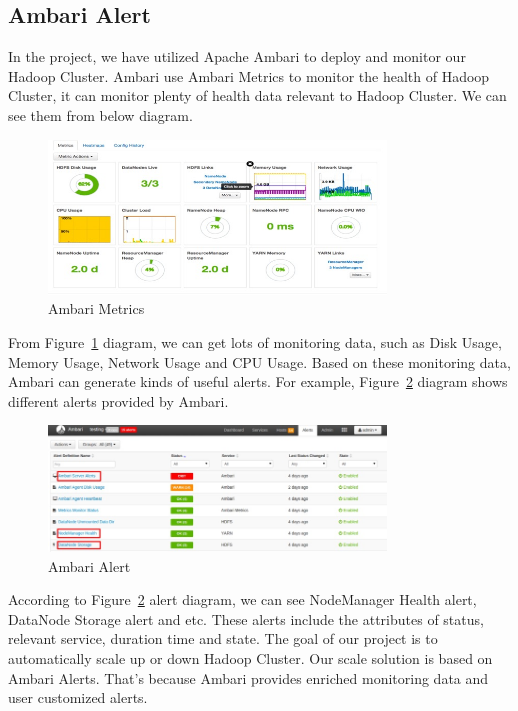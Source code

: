 \documentclass{article}
\begin{document}
\subsection{Ambari Alert}
In the project, we have utilized Apache Ambari to deploy and monitor our Hadoop Cluster. Ambari use Ambari Metrics to monitor the health of Hadoop Cluster, it can monitor plenty of health data relevant to Hadoop Cluster. We can see them from below diagram. 
\begin{figure}[ht!]
\centering
\includegraphics[width=0.8\textwidth,natwidth=1000,natheight=800]{AmbariMetrics.png}
\caption{Ambari Metrics}
\label{fig:AmbariMetrics}
\end{figure}
From Figure~\ref{fig:AmbariMetrics} diagram, we can get lots of monitoring data, such as Disk Usage, Memory Usage, Network Usage and CPU Usage. Based on these monitoring data, Ambari can generate kinds of useful alerts. For example, Figure~\ref{fig:AmbariAlerts} diagram shows different alerts provided by Ambari. 
\begin{figure}[ht!]
\centering
\includegraphics[width=0.8\textwidth,natwidth=1000,natheight=800]{AmbariAlerts.png}
\caption{Ambari Alert}
\label{fig:AmbariAlerts}
\end{figure}
According to Figure~\ref{fig:AmbariAlerts} alert diagram, we can see NodeManager Health alert, DataNode Storage alert and etc. These alerts include the attributes of status, relevant service, duration time and state. The goal of our project is to automatically scale up or down Hadoop Cluster. 
Our scale solution is based on Ambari Alerts. That’s because Ambari provides enriched monitoring data and user customized alerts. 
\end{document}
